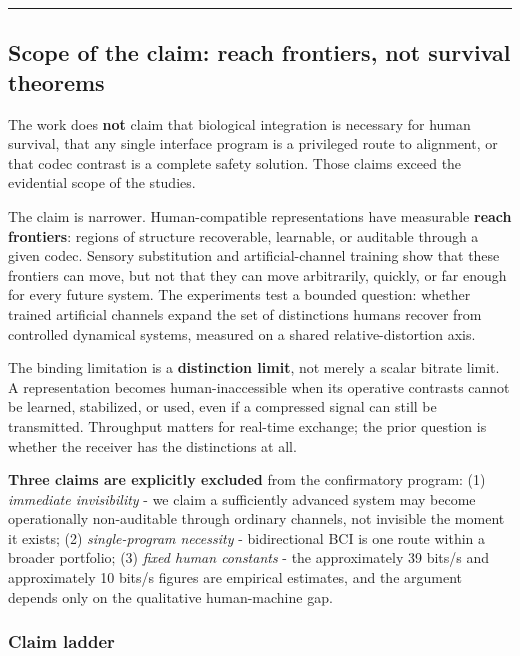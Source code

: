 \documentclass[
  11pt,
]{article}
\begin{document}
\begin{center}\rule{0.5\linewidth}{0.5pt}\end{center}

\subsection{Scope of the claim: reach frontiers,
not survival
theorems}\label{scope-of-the-claim-reach-frontiers-not-survival-theorems}

The work does \textbf{not} claim that biological
integration is necessary for human survival,
that any single interface program is a
privileged route to alignment, or that codec
contrast is a complete safety solution. Those
claims exceed the evidential scope of the
studies.

The claim is narrower. Human-compatible
representations have measurable \textbf{reach
frontiers}: regions of structure recoverable,
learnable, or auditable through a given codec.
Sensory substitution and artificial-channel
training show that these frontiers can move, but
not that they can move arbitrarily, quickly, or
far enough for every future system. The
experiments test a bounded question: whether
trained artificial channels expand the set of
distinctions humans recover from controlled
dynamical systems, measured on a shared
relative-distortion axis.

The binding limitation is a \textbf{distinction
limit}, not merely a scalar bitrate limit. A
representation becomes human-inaccessible when
its operative contrasts cannot be learned,
stabilized, or used, even if a compressed signal
can still be transmitted. Throughput matters for
real-time exchange; the prior question is
whether the receiver has the distinctions at
all.

\textbf{Three claims are explicitly excluded}
from the confirmatory program: (1)
\emph{immediate invisibility} - we claim a
sufficiently advanced system may become
operationally non-auditable through ordinary
channels, not invisible the moment it exists;
(2) \emph{single-program necessity} -
bidirectional BCI is one route within a broader
portfolio; (3) \emph{fixed human constants} -
the approximately 39 bits/s and approximately 10
bits/s figures are empirical estimates, and the
argument depends only on the qualitative
human-machine gap.

\subsubsection{Claim ladder}\label{claim-ladder}
\end{document}
